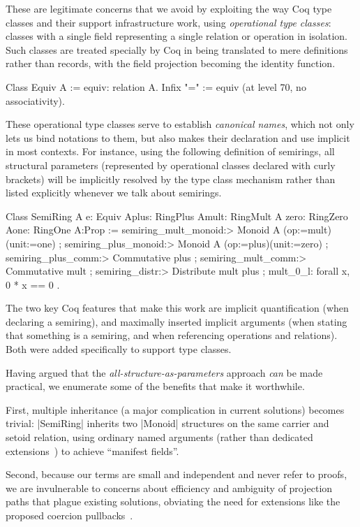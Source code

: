 \documentclass{llncs}
\begin{document}
These are legitimate concerns that we avoid by exploiting the way Coq type classes and their support infrastructure work, using \emph{operational type classes}: classes with a single field representing a single relation or operation in isolation. Such classes are treated specially by Coq in being translated to mere definitions rather than records, with the field projection becoming the identity function.
\begin{code}
 Class Equiv A := equiv: relation A.
 Infix "=" := equiv (at level 70, no associativity).
\end{code}
These operational type classes serve to establish \emph{canonical names}, which not only lets us bind notations to them, but also makes their declaration and use implicit in most contexts. For instance, using the following definition of semirings, all structural parameters (represented by operational classes declared with curly brackets) will be implicitly resolved by the type class mechanism rather than listed explicitly whenever we talk about semirings.
\begin{code}
Class SemiRing A {e: Equiv A}{plus: RingPlus A}{mult: RingMult A}
                 {zero: RingZero A}{one: RingOne A}:Prop :=
  { semiring_mult_monoid:> Monoid A (op:=mult)(unit:=one)
  ; semiring_plus_monoid:> Monoid A (op:=plus)(unit:=zero)
  ; semiring_plus_comm:> Commutative plus
  ; semiring_mult_comm:> Commutative mult
  ; semiring_distr:> Distribute mult plus
  ; mult_0_l: forall x, 0 * x == 0 }.
\end{code}
The two key Coq features that make this work are implicit quantification (when declaring a semiring), and maximally inserted implicit arguments (when stating that something is a semiring, and when referencing operations and relations). Both were added specifically to support type classes.

Having argued that the \emph{all-structure-as-parameters} approach \emph{can} be made practical, we enumerate some of the benefits that make it worthwhile.

First, multiple inheritance (a major complication in current solutions) becomes trivial: |SemiRing| inherits two |Monoid| structures on the same carrier and setoid relation, using ordinary named arguments (rather than dedicated extensions~\cite{DBLP:conf/types/Luo08}) to achieve ``manifest fields''.

Second, because our terms are small and independent and never refer to proofs, we are invulnerable to concerns about efficiency and ambiguity of projection paths that plague existing solutions, obviating the need for extensions like the proposed coercion pullbacks~\cite{Hints}.
\end{document}

